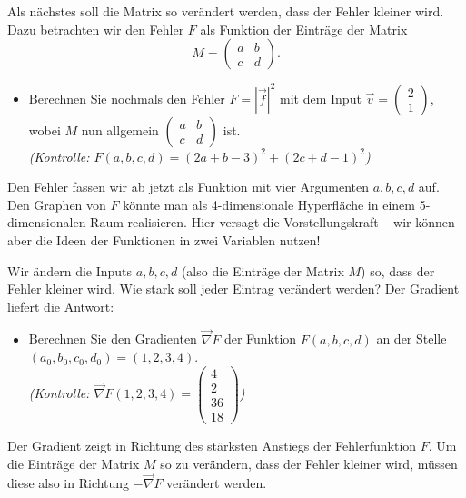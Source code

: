\begin{LA}
	Als nächstes soll die Matrix so verändert werden, dass der Fehler kleiner wird. Dazu betrachten wir den Fehler \( F \) als Funktion der Einträge der Matrix
	\[
		M = \begin{pmatrix} a & b \\ c & d \end{pmatrix}.
	\]

	\begin{itemize}
		\item Berechnen Sie nochmals den Fehler \( F = |\vec{f}|^2 \) mit dem Input \( \vec{v} = \begin{pmatrix} 2 \\ 1 \end{pmatrix} \), wobei \( M \) nun allgemein \( \begin{pmatrix} a & b \\ c & d \end{pmatrix} \) ist.\\
		      \textit{(Kontrolle: \( F(a,b,c,d) = (2a + b - 3)^2 + (2c + d - 1)^2 \))}
	\end{itemize}

	Den Fehler fassen wir ab jetzt als Funktion mit vier Argumenten \( a, b, c, d \) auf.
	Den Graphen von \( F \) könnte man als 4-dimensionale Hyperfläche in einem 5-dimensionalen Raum realisieren.
	Hier versagt die Vorstellungskraft – wir können aber die Ideen der Funktionen in zwei Variablen nutzen!

	\medskip

	Wir ändern die Inputs \( a, b, c, d \) (also die Einträge der Matrix \( M \)) so, dass der Fehler kleiner wird.
	Wie stark soll jeder Eintrag verändert werden? Der Gradient liefert die Antwort:

	\begin{itemize}
		\item Berechnen Sie den Gradienten \( \vec{\nabla}F \) der Funktion \( F(a,b,c,d) \) an der Stelle \( (a_0, b_0, c_0, d_0) = (1, 2, 3, 4) \).\\
		      \textit{(Kontrolle: \( \vec{\nabla}F(1,2,3,4) = \begin{pmatrix} 4 \\ 2 \\ 36 \\ 18 \end{pmatrix} \))}
	\end{itemize}

	Der Gradient zeigt in Richtung des stärksten Anstiegs der Fehlerfunktion \( F \).
	Um die Einträge der Matrix \( M \) so zu verändern, dass der Fehler kleiner wird, müssen diese also in Richtung \( -\vec{\nabla}F \) verändert werden.


\end{LA}
